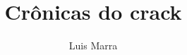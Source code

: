 \documentclass[12pt]{extarticle}
\begin{document}
\newcommand{\AutorLivro}{Luis Marra}
\newcommand{\TituloLivro}{Crônicas do crack}
\newcommand{\Tema}{Diálogos com a sociologia e com a antropologia}
\newcommand{\Genero}{Conto, crônica e novela}
\newcommand{\imagemCapa}{./images/PNLD0027-01.png}
\newcommand{\issnppub}{---}
\newcommand{\issnepub}{---}
\newcommand{\colaborador}{{Eduardo Modesto de Carvalho, Bruno Gradella e Vicente Castro}}


\title{\TituloLivro}
\author{\AutorLivro}
\def\authornotes{\colaborador}

\date{}
\maketitle

\baselineskip\par
\end{document}
